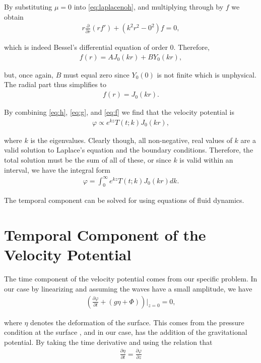 By substituting $\mu = 0$ into \eqref{eq:laplacenoh}, and multiplying through by $f$ we obtain
\begin{align*}
r \frac{\partial}{\partial r}(rf') + (k^2r^2 - 0^2)f = 0,
\end{align*}

which is indeed Bessel's differential equation of order $0$. Therefore,
\begin{align*}
f(r) = A J_0(kr) + B Y_0(kr),
\end{align*}

but, once again, $B$ must equal zero since $Y_0(0)$ is not finite which is unphysical. The radial part thus simplifies to
\begin{align}
\label{eq:f}
f(r) = J_0(kr).
\end{align}

By combining \eqref{eq:h}, \eqref{eq:g}, and \eqref{eq:f} we find that the velocity potential is 
\begin{align*}
\varphi \propto e^{kz}T(t;k)J_0(kr),
\end{align*}

where $k$ is the eigenvalues. Clearly though, all non-negative, real values of $k$ are a valid solution to Laplace's equation and the boundary conditions. Therefore, the total solution must be the sum of all of these, or since $k$ is valid within an interval, we have the integral form 
\begin{align}
\label{eq:phieigen}
\varphi = \int_0^\infty e^{kz}T(t;k)J_0(kr)dk.
\end{align}

The temporal component can be solved for using equations of fluid dynamics.

\section{Temporal Component of the Velocity Potential}

The time component of the velocity potential comes from our specific problem. In our case by linearizing and assuming the waves have a small amplitude, we have
\begin{align*}
\left( \frac{\partial \varphi}{\partial t} + (g \eta + \Phi) \right) \bigg|_{z=0} = 0,
\end{align*}

where $\eta$ denotes the deformation of the surface. This comes from the pressure condition at the surface \cite{fluids}, and in our case, has the addition of the gravitational potential. By taking the time derivative and using the relation that
\begin{align}
\label{eq:smallamp}
\frac{\partial \eta}{\partial t} = \frac{\partial \varphi}{\partial z}
\end{align}


